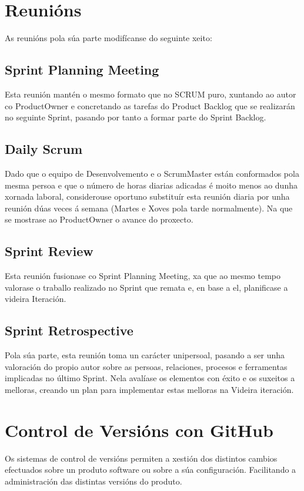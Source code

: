 \section{Reunións}
As reunións pola súa parte modifícanse do seguinte xeito:

    \subsection{Sprint Planning Meeting}
        Esta reunión mantén o mesmo formato que no SCRUM puro, xuntando ao autor co	ProductOwner 
        e concretando as tarefas do Product Backlog que se realizarán no seguinte Sprint, pasando
        por tanto a formar parte do Sprint Backlog.
    
    \subsection{Daily Scrum}
        Dado que o equipo de Desenvolvemento e o ScrumMaster están conformados pola mesma persoa
        e que o número de horas diarias adicadas é moito menos ao dunha xornada laboral, considerouse
        oportuno substituír esta reunión diaria por unha reunión dúas veces á semana (Martes e Xoves 
        pola tarde normalmente). Na que se mostrase ao ProductOwner o avance do proxecto.
    
    \subsection{Sprint Review}
        Esta reunión fusionase co Sprint Planning Meeting, xa que ao mesmo tempo valorase o traballo
        realizado no Sprint que remata e, en base a el, planificase a videira Iteración. 
    
    \subsection{Sprint Retrospective}
        Pola súa parte, esta reunión toma un carácter unipersoal, pasando a ser unha valoración do
        propio autor sobre as persoas, relaciones, procesos e ferramentas implicadas no último Sprint.
        Nela avalíase os elementos con éxito e os suxeitos a melloras, creando un plan para implementar
        estas melloras na Videira iteración.

\section{Control de Versións con GitHub}
    Os sistemas de control de versións permiten a xestión dos distintos cambios efectuados sobre
    un produto software ou sobre a súa configuración. Facilitando a administración das distintas
    versións do produto. 
    
